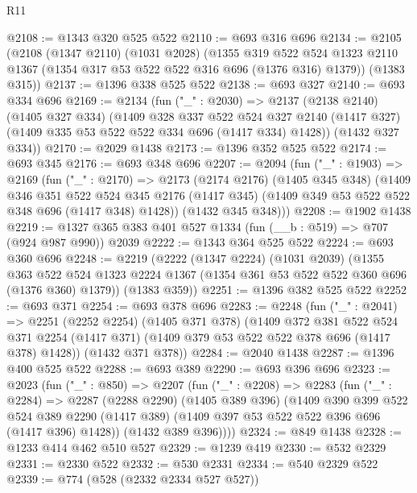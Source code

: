 \begin{lexlean}{R11}
\begin{coremodule}
@2108 := @1343 @320 @525 @522
@2110 := @693 @316 @696
@2134 := @2105
    (@2108
      (@1347 @2110)
      (@1031 @2028)
      (@1355
        @319
        @522
        @524
        @1323
        @2110
        @1367
        (@1354 @317 @53 @522 @522 @316 @696 (@1376 @316) @1379))
      (@1383 @315))
@2137 := @1396 @338 @525 @522
@2138 := @693 @327
@2140 := @693 @334 @696
@2169 := @2134
    (fun ("_" : @2030) =>
    @2137
      (@2138 @2140)
      (@1405 @327 @334)
      (@1409
        @328
        @337
        @522
        @524
        @327
        @2140
        (@1417 @327)
        (@1409 @335 @53 @522 @522 @334 @696 (@1417 @334) @1428))
      (@1432 @327 @334))
@2170 := @2029 @1438
@2173 := @1396 @352 @525 @522
@2174 := @693 @345
@2176 := @693 @348 @696
@2207 := @2094
    (fun ("_" : @1903) =>
    @2169
      (fun ("_" : @2170) =>
      @2173
        (@2174 @2176)
        (@1405 @345 @348)
        (@1409
          @346
          @351
          @522
          @524
          @345
          @2176
          (@1417 @345)
          (@1409 @349 @53 @522 @522 @348 @696 (@1417 @348) @1428))
        (@1432 @345 @348)))
@2208 := @1902 @1438
@2219 := @1327 @365 @383 @401 @527 @1334 (fun (__b : @519) => @707 (@924 @987 @990)) @2039
@2222 := @1343 @364 @525 @522
@2224 := @693 @360 @696
@2248 := @2219
    (@2222
      (@1347 @2224)
      (@1031 @2039)
      (@1355
        @363
        @522
        @524
        @1323
        @2224
        @1367
        (@1354 @361 @53 @522 @522 @360 @696 (@1376 @360) @1379))
      (@1383 @359))
@2251 := @1396 @382 @525 @522
@2252 := @693 @371
@2254 := @693 @378 @696
@2283 := @2248
    (fun ("_" : @2041) =>
    @2251
      (@2252 @2254)
      (@1405 @371 @378)
      (@1409
        @372
        @381
        @522
        @524
        @371
        @2254
        (@1417 @371)
        (@1409 @379 @53 @522 @522 @378 @696 (@1417 @378) @1428))
      (@1432 @371 @378))
@2284 := @2040 @1438
@2287 := @1396 @400 @525 @522
@2288 := @693 @389
@2290 := @693 @396 @696
@2323 := @2023
    (fun ("_" : @850) =>
    @2207
      (fun ("_" : @2208) =>
      @2283
        (fun ("_" : @2284) =>
        @2287
          (@2288 @2290)
          (@1405 @389 @396)
          (@1409
            @390
            @399
            @522
            @524
            @389
            @2290
            (@1417 @389)
            (@1409 @397 @53 @522 @522 @396 @696 (@1417 @396) @1428))
          (@1432 @389 @396))))
@2324 := @849 @1438
@2328 := @1233 @414 @462 @510 @527
@2329 := @1239 @419
@2330 := @532 @2329
@2331 := @2330 @522
@2332 := @530 @2331
@2334 := @540 @2329 @522
@2339 := @774 (@528 (@2332 @2334 @527 @527))

\end{coremodule}
\end{lexlean}
